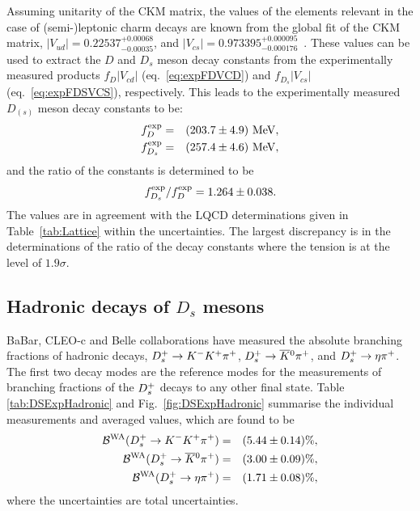 Assuming unitarity of the CKM matrix, the values of the elements relevant in the case of \mbox{(semi-)leptonic} charm decays are known from the global fit
of the CKM matrix, $|V_{ud}|=0.22537^{+0.00068}_{-0.00035}$, and $|V_{cs}|=0.973395^{+0.000095}_{-0.000176}$~\cite{}. These values can be used to extract
the $D$ and $D_s$ meson decay constants from the experimentally measured products $f_{D}|V_{cd}|$ (eq.~\ref{eq:expFDVCD}) and $f_{D_s}|V_{cs}|$ (eq.~\ref{eq:expFDSVCS}),
respectively. This leads to the experimentally measured $D_{(s)}$ meson decay constants to be:
\begin{eqnarray}
f_D^{\rm exp} & = & (203.7\pm4.9)~{\rm MeV,}\nonumber\\ 
f_{D_s}^{\rm exp} & = & (257.4\pm4.6)~{\rm MeV,}\nonumber\\ 
\end{eqnarray}
and the ratio of the constants is determined to be
\[
f_{D_s}^{\rm exp}/f_D^{\rm exp} = 1.264\pm0.038.
\]
The values are in agreement with the LQCD determinations given in Table~\ref{tab:Lattice} within the uncertainties. The largest discrepancy is in the determinations of 
the ratio of the decay constants where the tension is at the level of $1.9\sigma$.


\clearpage
\subsection{Hadronic decays of $D_s$ mesons}

BaBar, CLEO-c and Belle collaborations have measured the absolute branching fractions of hadronic decays, $D_{s}^+\to K^-K^+\pi^+$, $D_{s}^+\to \overline{K}{}^0\pi^+$, and $D_{s}^+ \to \eta\pi^+$. The first two 
decay modes are the reference modes for the measurements of branching fractions of the $D_{s}^+$ decays to any other final state. Table \ref{tab:DSExpHadronic} and 
Fig.~\ref{fig:DSExpHadronic} summarise the individual measurements and averaged values, which are found to be 
\begin{eqnarray}
{\cal B}^{\rm WA}(D_{s}^+\to K^-K^+\pi^+) & = & (5.44\pm0.14)\%,\\
{\cal B}^{\rm WA}(D_{s}^+\to \overline{K}{}^0\pi^+) & = & (3.00\pm0.09)\%,\\
{\cal B}^{\rm WA}(D_{s}^+\to \eta\pi^+) & = & (1.71\pm0.08)\%,
\end{eqnarray}
where the uncertainties are total uncertainties. 

